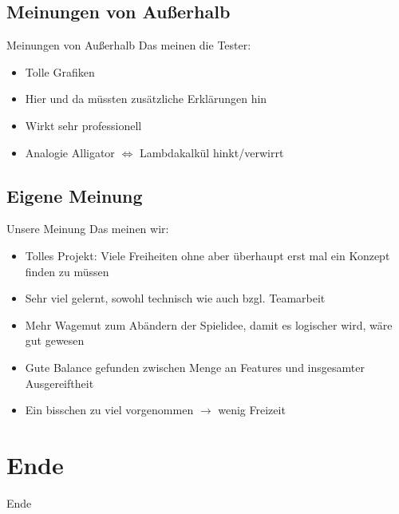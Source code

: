 \documentclass[18pt]{beamer}
\begin{document}
	\subsection{Meinungen von Außerhalb}
	\begin{frame}[<+->]{Meinungen von Außerhalb}
		Das meinen die Tester:
		\begin{itemize}
			\item Tolle Grafiken
			\item Hier und da müssten zusätzliche Erklärungen hin
			\item Wirkt sehr professionell
			\item Analogie Alligator $\Leftrightarrow$ Lambdakalkül hinkt/verwirrt
		\end{itemize}
	\end{frame}

	\subsection{Eigene Meinung}
	\begin{frame}[<+->]{Unsere Meinung}
		Das meinen wir:
		\begin{itemize}
			\item Tolles Projekt: Viele Freiheiten ohne aber überhaupt erst mal ein Konzept finden zu müssen
			\item Sehr viel gelernt, sowohl technisch wie auch bzgl. Teamarbeit
			\item Mehr Wagemut zum Abändern der Spielidee, damit es logischer wird, wäre gut gewesen
			\item Gute Balance gefunden zwischen Menge an Features und insgesamter Ausgereiftheit
			\item Ein bisschen zu viel vorgenommen $\rightarrow$ wenig Freizeit
		\end{itemize}
	\end{frame}


\section{Ende}
	\begin{frame}{Ende}
	\end{frame}
	
\end{document}
